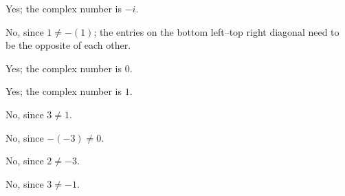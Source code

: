 \documentclass[../key.tex]{subfiles}
\begin{document}
\begin{iinner_problem}
\item {}
\end{iinner_problem}

Yes; the complex number is $-i$.

\begin{iinner_problem}
\item {}
\end{iinner_problem}

No, since $1\neq -(1)$; the entries on the bottom left--top right diagonal need to be the opposite of each other.

\begin{iinner_problem}
\item {}
\end{iinner_problem}

Yes; the complex number is $0$.

\begin{iinner_problem}
\item {}
\end{iinner_problem}

Yes; the complex number is $1$.

\begin{iinner_problem}
\item {}
\end{iinner_problem}

No, since $3\neq 1$.

\begin{iinner_problem}
\item {}
\end{iinner_problem}

No, since $-(-3)\neq 0$.

\begin{iinner_problem}
\item {}
\end{iinner_problem}

No, since $2\neq -3$.

\begin{iinner_problem}
\item {}
\end{iinner_problem}

No, since $3\neq -1$.

\begin{iinner_problem}
\item {}
\end{iinner_problem}
\end{document}
